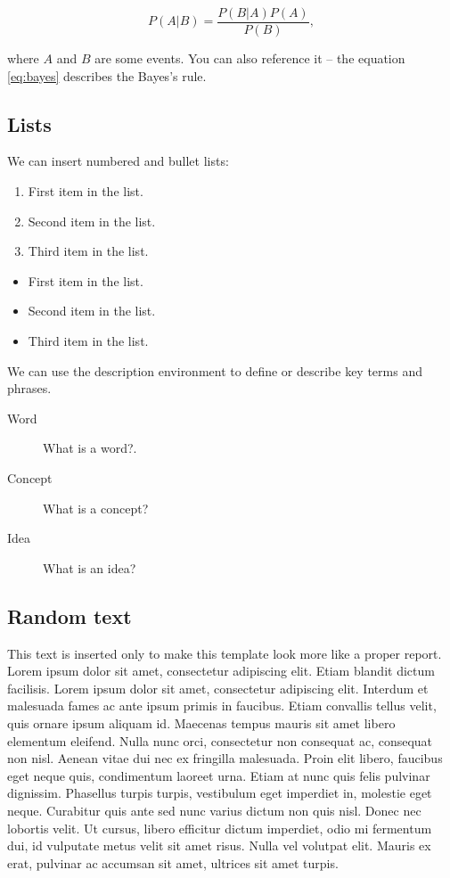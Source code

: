 \documentclass[fleqn,moreauthors,10pt]{ds_report}
\begin{document}
\begin{equation}
	P(A|B) = \frac{P(B|A)P(A)}{P(B)},
	\label{eq:bayes}
\end{equation}

where $A$ and $B$ are some events. You can also reference it -- the equation \ref{eq:bayes} describes the Bayes's rule.

\subsection*{Lists}

We can insert numbered and bullet lists:

\begin{enumerate}[noitemsep] 
	\item First item in the list.
	\item Second item in the list.
	\item Third item in the list.
\end{enumerate}

\begin{itemize}[noitemsep] 
	\item First item in the list.
	\item Second item in the list.
	\item Third item in the list.
\end{itemize}

We can use the description environment to define or describe key terms and phrases.

\begin{description}
	\item[Word] What is a word?.
	\item[Concept] What is a concept?
	\item[Idea] What is an idea?
\end{description}


\subsection*{Random text}

This text is inserted only to make this template look more like a proper report. Lorem ipsum dolor sit amet, consectetur adipiscing elit. Etiam blandit dictum facilisis. Lorem ipsum dolor sit amet, consectetur adipiscing elit. Interdum et malesuada fames ac ante ipsum primis in faucibus. Etiam convallis tellus velit, quis ornare ipsum aliquam id. Maecenas tempus mauris sit amet libero elementum eleifend. Nulla nunc orci, consectetur non consequat ac, consequat non nisl. Aenean vitae dui nec ex fringilla malesuada. Proin elit libero, faucibus eget neque quis, condimentum laoreet urna. Etiam at nunc quis felis pulvinar dignissim. Phasellus turpis turpis, vestibulum eget imperdiet in, molestie eget neque. Curabitur quis ante sed nunc varius dictum non quis nisl. Donec nec lobortis velit. Ut cursus, libero efficitur dictum imperdiet, odio mi fermentum dui, id vulputate metus velit sit amet risus. Nulla vel volutpat elit. Mauris ex erat, pulvinar ac accumsan sit amet, ultrices sit amet turpis.
\end{document}
